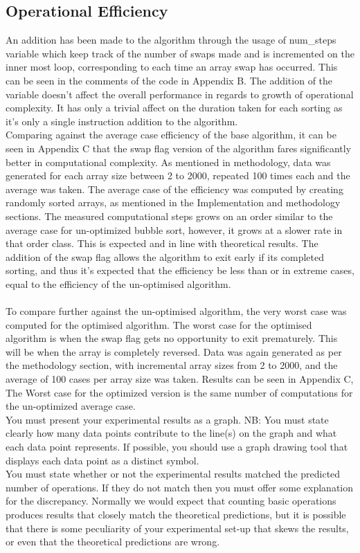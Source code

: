 \documentclass[]{article}
\begin{document}
\subsection{Operational Efficiency}
An addition has been made to the algorithm through the usage of num\_steps variable which keep track of the number of swaps made and is incremented on the inner most loop, corresponding to each time an array swap has occurred. This can be seen in the comments of the code in Appendix B. The addition of the variable doesn't affect the overall performance in regards to growth of operational complexity. It has only a trivial affect on the duration taken for each sorting as it's only a single instruction addition to the algorithm.
\\
Comparing against the average case efficiency of the base algorithm, it can be seen in Appendix C that the swap flag version of the algorithm fares significantly better in computational complexity. As mentioned in methodology, data was generated for each array size between 2 to 2000, repeated 100 times each and the average was taken. The average case of the efficiency was computed by creating randomly sorted arrays, as mentioned in the Implementation and methodology sections. The measured computational steps grows on an order similar to the average case for un-optimized bubble sort, however, it grows at a slower rate in that order class. This is expected and in line with theoretical results. The addition of the swap flag allows the algorithm to exit early if its completed sorting, and thus it's expected that the efficiency be less than or in extreme cases, equal to the efficiency of the un-optimised algorithm. 
\\\\
To compare further against the un-optimised algorithm, the very worst case was computed for the optimised algorithm. The worst case for the optimised algorithm is when the swap flag gets no opportunity to exit prematurely. This will be when the array is completely reversed. Data was again generated as per the methodology section, with incremental array sizes from 2 to 2000, and the average of 100 cases per array size was taken. Results can be seen in Appendix C, The Worst case for the optimized version is the same number of computations for the un-optimized average case. 
\\
You must present your experimental results as a graph. NB: You must state clearly how many
data points contribute to the line(s) on the graph and what each data point represents. If
possible, you should use a graph drawing tool that displays each data point as a distinct
symbol.
\\
You must state whether or not the experimental results matched the predicted number of
operations. If they do not match then you must offer some explanation for the discrepancy.
Normally we would expect that counting basic operations produces results that closely match
the theoretical predictions, but it is possible that there is some peculiarity of your experimental
set-up that skews the results, or even that the theoretical predictions are wrong.
\end{document}
